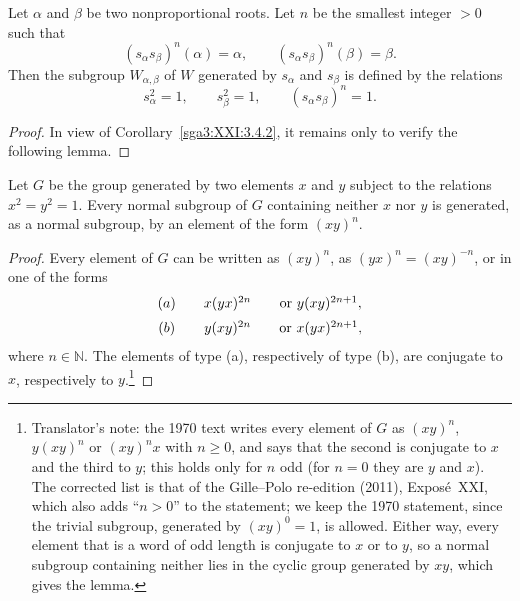 \begin{corollary}\label{sga3:XXI:3.4.3}
Let \(\alpha\) and \(\beta\) be two nonproportional roots. Let \(n\)
be the smallest integer \(>0\) such that
\[
 (s_\alpha s_\beta)^n(\alpha)=\alpha,
 \qquad
 (s_\alpha s_\beta)^n(\beta)=\beta.
\]
Then the subgroup \(W_{\alpha,\beta}\) of \(W\) generated by
\(s_\alpha\) and \(s_\beta\) is defined by the relations
\[
 s_\alpha^2=1,\qquad
 s_\beta^2=1,\qquad
 (s_\alpha s_\beta)^n=1.
\]
\end{corollary}

\begin{proof}
In view of Corollary~\ref{sga3:XXI:3.4.2}, it remains only to verify
the following lemma.
\end{proof}

\begin{lemma}\label{sga3:XXI:3.4.4}
Let \(G\) be the group generated by two elements \(x\) and \(y\)
subject to the relations \(x^2=y^2=1\). Every normal subgroup of
\(G\) containing neither \(x\) nor \(y\) is generated, as a normal
subgroup, by an element of the form \((xy)^n\).
\end{lemma}

\begin{proof}
Every element of \(G\) can be written as \((xy)^n\), as
\((yx)^n=(xy)^{-n}\), or in one of the forms
\[
\begin{array}{c@{\qquad}c@{\qquad}c}
 (a) & x(yx)^{2n} & \text{or } y(xy)^{2n+1},\\[2mm]
 (b) & y(xy)^{2n} & \text{or } x(yx)^{2n+1},
\end{array}
\]
where \(n\in\mathbb{N}\). The elements of type (a), respectively of
type (b), are conjugate to \(x\), respectively to \(y\).\footnote{Translator's note: the
1970 text writes every element of \(G\) as \((xy)^n\), \(y(xy)^n\) or \((xy)^nx\) with
\(n\geq0\), and says that the second is conjugate to \(x\) and the third to \(y\); this
holds only for \(n\) odd (for \(n=0\) they are \(y\) and \(x\)). The corrected list is
that of the Gille--Polo re-edition (2011), Exposé~XXI, which also adds ``\(n>0\)'' to the
statement; we keep the 1970 statement, since the trivial subgroup, generated by
\((xy)^0=1\), is allowed. Either way, every element that is a word of odd length is
conjugate to \(x\) or to \(y\), so a normal subgroup containing neither lies in the
cyclic group generated by \(xy\), which gives the lemma.}
\end{proof}

